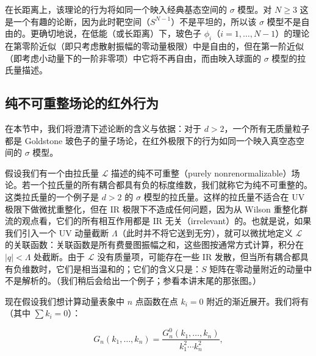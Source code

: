 在长距离上，该理论的行为将如同一个映入经典基态空间的 $\sigma$ 模型。对 $N\ge3$ 这是一个有趣的论断，因为此时靶空间（$S^{N-1}$）不是平坦的，所以该 $\sigma$ 模型不是自由的。更确切地说，在低能（或长距离）下，玻色子 $\phi_i$（$i=1,\dots,N-1$）的理论在第零阶近似（即只考虑散射振幅的零动量极限）中是自由的，但在第一阶近似（即考虑小动量下的一阶非零项）中它将不再自由，而由映入球面的 $\sigma$ 模型的拉氏量描述。


\subsection{纯不可重整场论的红外行为}

在本节中，我们将澄清下述论断的含义与依据：对于 $d>2$，一个所有无质量粒子都是 Goldstone 玻色子的量子场论，在红外极限下的行为如同一个映入真空态空间的 $\sigma$ 模型。

假设我们有一个由拉氏量 $\mathcal{L}$ 描述的纯不可重整（purely nonrenormalizable）场论。若一个拉氏量的所有耦合都具有负的标度维数，我们就称它为纯不可重整的。这类拉氏量的一个例子是 $d>2$ 的 $\sigma$ 模型的拉氏量。这样的拉氏量不适合在 UV 极限下做微扰重整化，但在 IR 极限下不造成任何问题，因为从 Wilson 重整化群流的观点看，它们的所有相互作用都是 IR 无关（irrelevant）的。也就是说，如果我们引入一个 UV 动量截断 $\Lambda$（此时并不将它送到无穷），就可以微扰地定义 $\mathcal{L}$ 的关联函数：关联函数是所有费曼图振幅之和，这些图按通常方式计算，积分在 $|q|<\Lambda$ 处截断。由于 $\mathcal{L}$ 没有质量项，可能存在一些 IR 发散，但当所有耦合都具有负维数时，它们是相当温和的；它们的含义只是：$S$ 矩阵在零动量附近的动量中不是解析的。（我们稍后会给出一个例子；参看本讲末尾的那张图。）

现在假设我们想计算动量表象中 $n$ 点函数在点 $k_i=0$ 附近的渐近展开。我们将有（其中 $\sum k_i=0$）：

\begin{equation}
  \tag{1.31}
  \label{eq:1-31}
  G_n(k_1,\dots,k_n)=\frac{G_n^0(k_1,\dots,k_n)}{k_1^2\cdots k_n^2},
\end{equation}


